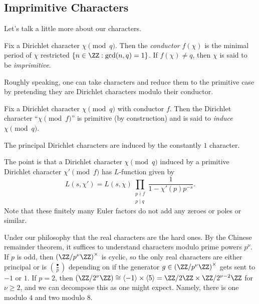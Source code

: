 \documentclass[../notes.tex]{subfiles}
\begin{document}
\subsection{Imprimitive Characters}
Let's talk a little more about our characters.
\begin{definition}[conductor] 
	Fix a Dirichlet character $\chi\pmod q$. Then the \textit{conductor} $f(\chi)$ is the minimal period of $\chi$ restricted $\{n\in\ZZ:\gcd(n,q)=1\}$. If $f(\chi)\ne q$, then $\chi$ is said to be \textit{imprimitive}.
\end{definition}
Roughly speaking, one can take characters and reduce them to the primitive case by pretending they are Dirichlet characters modulo their conductor.
\begin{definition}[induces]
	Fix a Dirichlet character $\chi\pmod q$ with conductor $f$. Then the Dirichlet character ``$\chi\pmod f$'' is primitive (by construction) and is said to \textit{induce} $\chi\pmod q$.
\end{definition}
\begin{example}
	The principal Dirichlet characters are induced by the constantly $1$ character.
\end{example}
\begin{remark}
	The point is that a Dirichlet character $\chi\pmod q$ induced by a primitive Dirichlet character $\chi'\pmod f$ has $L$-function given by
	\[L(s,\chi')=L(s,\chi)\prod_{\substack{p\nmid f\\p\mid q}}\frac1{1-\chi'(p)p^{-s}}.\]
	Note that these finitely many Euler factors do not add any zeroes or poles or similar.
\end{remark}
\begin{remark}
	Under our philosophy that the real characters are the hard ones. By the Chinese remainder theorem, it suffices to understand characters modulo prime powers $p^\nu$. If $p$ is odd, then $\left(\ZZ/p^\nu\ZZ\right)^\times$ is cyclic, so the only real characters are either principal or is $\left(\frac\bullet p\right)$ depending on if the generator $g\in\left(\ZZ/p^\nu\ZZ\right)^\times$ gets sent to $-1$ or $1$. If $p=2$, then $\left(\ZZ/2^\nu\ZZ\right)\cong\langle-1\rangle\times\langle5\rangle=\ZZ/2\ZZ\times\ZZ/2^{\nu-2}\ZZ$ for $\nu\ge2$, and we can decompose this as one might expect. Namely, there is one modulo $4$ and two modulo $8$. 
\end{remark}
\end{document}
